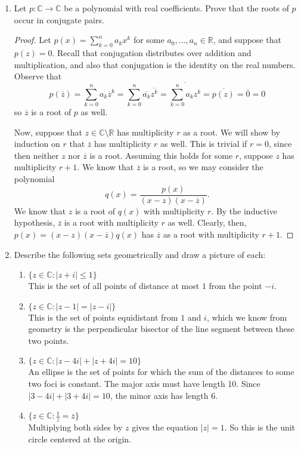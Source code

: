\documentclass[10pt]{article}
\newcommand{\R}{\mathbb{R}}
\newcommand{\C}{\mathbb{C}}
\renewcommand{\bar}{\overline}
\begin{document}
\begin{enumerate}
\item Let $p:\C \rightarrow \C$ be a polynomial with real coefficients.  Prove that the roots of $p$ occur in conjugate pairs.

\begin{proof}
Let $p(x) = \sum_{k=0}^n a_k x^k$ for some $a_0, \dots, a_n \in \R$, and suppose that $p(z) = 0$.  Recall that conjugation distributes over addition and multiplication, and also that conjugation is the identity on the real numbers.  Observe that
$$
p(\bar{z}) = \sum_{k=0}^n a_k \bar{z}^k
= \sum_{k=0}^n \bar{a_k} \bar{z^k}
= \bar{\sum_{k=0}^n a_k z^k}
= \bar{p(z)}
=\bar{0}
=0
$$
so $\bar{z}$ is a root of $p$ as well.

Now, suppose that $z \in \C \setminus \R$ has multiplicity $r$ as a root.  We will show by induction on $r$ that $\bar{z}$ has multiplicity $r$ as well.  This is trivial if $r = 0$, since then neither $z$ nor $\bar{z}$ is a root.  Assuming this holds for some $r$, suppose $z$ has multiplicity $r+1$.  We know that $\bar{z}$ is a root, so we may consider the polynomial
$$
q(x) = \frac{p(x)}{(x-z)(x-\bar{z})}.
$$
We know that $z$ is a root of $q(x)$ with multiplicity $r$.  By the inductive hypothesis, $\bar{z}$ is a root with multiplicity $r$ as well.  Clearly, then, $p(x) = (x-z)(x-\bar{z})q(x)$ has $\bar{z}$ as a root with multiplicity $r+1$.
\end{proof}

\item Describe the following sets geometrically and draw a picture of each:
\begin{enumerate}
\item $\{z \in \C : |z+i| \leq 1 \}$
\\
This is the set of all points of distance at most $1$ from the point $-i$.
\item $\{z \in \C : |z-1| = |z-i| \}$
\\
This is the set of points equidistant from $1$ and $i$, which we know from geometry is the perpendicular bisector of the line segment between these two points.
\item $\{z \in \C : |z-4i| + |z+4i| = 10 \}$
\\
An ellipse is the set of points for which the sum of the distances to some two foci is constant.  The major axis must have length 10.  Since $|3-4i| + |3+4i| = 10$, the minor axis has length 6.
\item $\{z \in \C : \frac{1}{z} = \bar{z} \}$
\\
Multiplying both sides by $z$ gives the equation $|z| = 1$.  So this is the unit circle centered at the origin.
\end{enumerate}
\begin{center}
\begin{tikzpicture}


\end{tikzpicture}
\end{center}
\end{enumerate}
\end{document}

